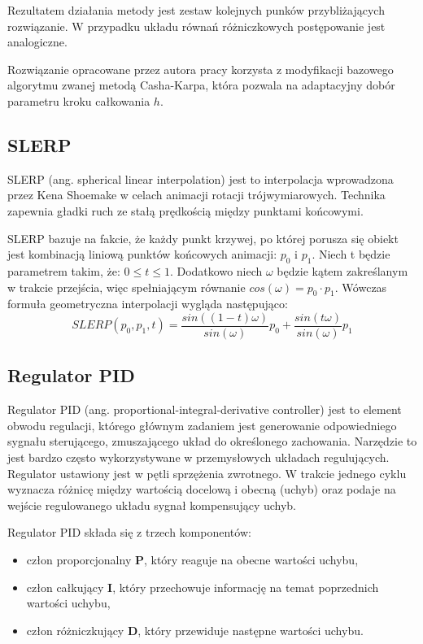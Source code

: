 \documentclass[12pt, oneside]{report}
\theoremstyle{definition}
\begin{document}
Rezultatem działania metody jest zestaw kolejnych punków przybliżających rozwiązanie. W przypadku układu równań różniczkowych postępowanie jest analogiczne. 

Rozwiązanie opracowane przez autora pracy korzysta z modyfikacji bazowego algorytmu zwanej metodą Casha-Karpa, która pozwala na adaptacyjny dobór parametru kroku całkowania \(h\).

\subsection{SLERP}
\label{SLERP}
SLERP (ang. spherical linear interpolation) jest to interpolacja wprowadzona przez Kena Shoemake w celach animacji rotacji trójwymiarowych. Technika zapewnia gładki ruch ze stałą prędkością między punktami końcowymi.

SLERP bazuje na fakcie, że każdy punkt krzywej, po której porusza się obiekt jest kombinacją liniową punktów końcowych animacji: $p_0$ i $p_1$. Niech t będzie parametrem takim, że: $0 \leqslant t \leqslant 1$. Dodatkowo niech $\omega$ będzie kątem zakreślanym w trakcie przejścia, więc spełniającym równanie $cos(\omega) = p_0 \cdot p_1$.
Wówczas formuła geometryczna interpolacji wygląda następująco:
\begin{equation*}
SLERP(p_0, p_1, t) = \frac{sin((1-t)\omega)}{sin(\omega)} p_0 + \frac{sin(t\omega)}{sin(\omega)} p_1
\end{equation*}

\subsection{Regulator PID}
\label{PIDSection}
Regulator PID (ang. proportional-integral-derivative controller) jest to element obwodu regulacji, którego głównym zadaniem jest generowanie odpowiedniego sygnału sterującego, zmuszającego układ do określonego zachowania. Narzędzie to jest bardzo często wykorzystywane w przemysłowych układach regulujących. Regulator ustawiony jest w pętli sprzężenia zwrotnego. W trakcie jednego cyklu wyznacza różnicę między wartością docelową i obecną (uchyb) oraz podaje na wejście regulowanego układu sygnał kompensujący uchyb.


 Regulator PID składa się z trzech komponentów:
\begin{itemize}
\item człon proporcjonalny \textbf{P}, który reaguje na obecne wartości uchybu,
\item człon całkujący \textbf{I}, który przechowuje informację na temat poprzednich wartości uchybu,
\item człon różniczkujący \textbf{D}, który przewiduje następne wartości uchybu.
\end{itemize}
\end{document}
